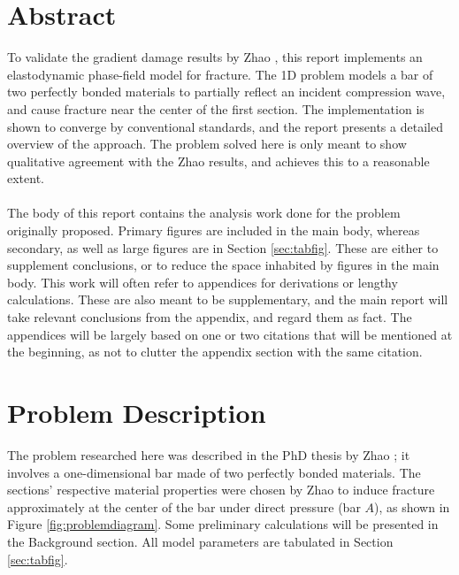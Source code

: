 \documentclass[onehalfspace]{Report}
\begin{document}
\section*{Abstract}
To validate the gradient damage results by Zhao \cite{ZhaoThesis}, this report implements an elastodynamic phase-field model for fracture. The 1D problem models a bar of two perfectly bonded materials to partially reflect an incident compression wave, and cause fracture near the center of the first section. The implementation is shown to converge by conventional standards, and the report presents a detailed overview of the approach. The problem solved here is only meant to show qualitative agreement with the Zhao results, and achieves this to a reasonable extent. \\
\\
The body of this report contains the analysis work done for the problem originally proposed. Primary figures are included in the main body, whereas secondary, as well as large figures are in Section \ref{sec:tabfig}. These are either to supplement conclusions, or to reduce the space inhabited by figures in the main body. This work will often refer to appendices for derivations or lengthy calculations. These are also meant to be supplementary, and the main report will take relevant conclusions from the appendix, and regard them as fact. The appendices will be largely based on one or two citations that will be mentioned at the beginning, as not to clutter the appendix section with the same citation.


\pagebreak
\section{Problem Description}
The problem researched here was described in the PhD thesis by Zhao \cite{ZhaoThesis}; it involves a one-dimensional bar made of two perfectly bonded materials. The sections' respective material properties were chosen by Zhao to induce fracture approximately at the center of the bar under direct pressure (bar $A$), as shown in Figure \ref{fig:problemdiagram}. Some preliminary calculations will be presented in the Background section. All model parameters are tabulated in Section \ref{sec:tabfig}.
\end{document}
